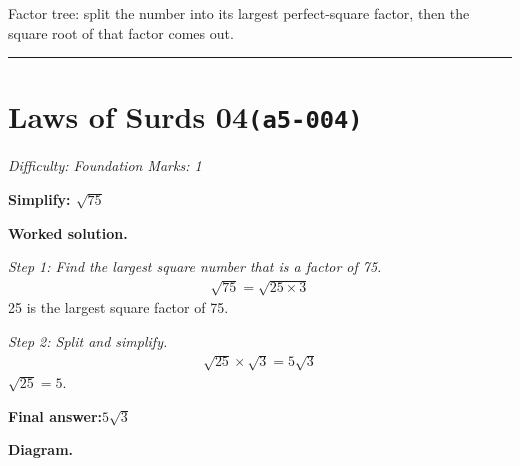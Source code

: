 \documentclass[11pt]{article}
\newcommand{\question}[1]{\par\medskip\noindent\textbf{#1}\par}
\begin{document}
\begin{center}
\end{center}
\small Factor tree: split the number into its largest perfect-square factor, then the square root of that factor comes out.\normalsize

\medskip\hrule

\section*{Laws of Surds 04\quad\small\texttt{(a5-004)}}
\textit{Difficulty: Foundation \quad\textbar\quad Marks: 1}

\question{Simplify: \( \sqrt{75} \)}

\textbf{Worked solution.}

\textit{Step 1: Find the largest square number that is a factor of 75.}
\[\begin{gathered}
\sqrt{75} = \sqrt{25 \times 3}
\end{gathered}\]
25 is the largest square factor of 75.

\textit{Step 2: Split and simplify.}
\[\begin{gathered}
\sqrt{25} \times \sqrt{3} = 5\sqrt{3}
\end{gathered}\]
\( \sqrt{25} = 5 \).

\begin{answerbox}
\textbf{Final answer:}\quad \(\displaystyle 5\sqrt{3}\)
\end{answerbox}
\textbf{Diagram.}
\end{document}
